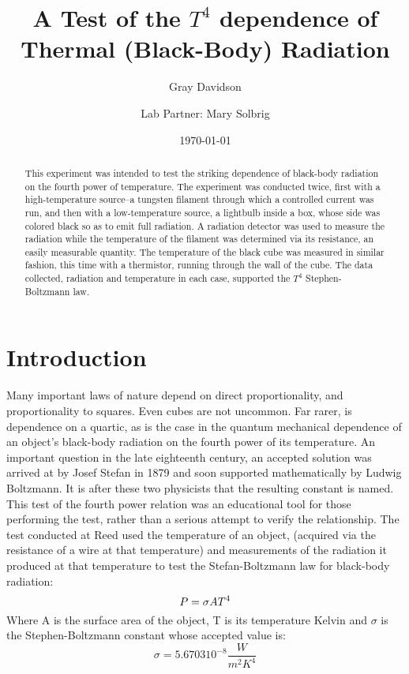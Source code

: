 \documentclass[aps,pre,twocolumn,nofootinbib]{revtex4}
\begin{document}
\title{A Test of the $T^4$ dependence of Thermal (Black-Body) Radiation}

\author{Gray Davidson}
\author{Lab Partner: Mary Solbrig }

\date{\today}

\begin{abstract}  
This experiment was intended to test the striking dependence of black-body radiation on the fourth power of temperature.  The experiment was conducted twice, first with a high-temperature source--a tungsten filament through which a controlled current was run, and then with a low-temperature source, a lightbulb inside a box, whose side was colored black so as to emit full radiation.  A radiation detector was used to measure the radiation while the temperature of the filament was determined via its resistance, an easily measurable quantity.  The temperature of the black cube was measured in similar fashion, this time with a thermistor, running through the wall of the cube.  The data collected, radiation and temperature in each case, supported the $T^4$ Stephen-Boltzmann law.   
\end{abstract}
\maketitle

\section{Introduction}

Many important laws of nature depend on direct proportionality, and proportionality to squares.  Even cubes are not uncommon.  Far rarer, is dependence on a quartic, as is the case in the quantum mechanical dependence of an object's black-body radiation on the fourth power of its temperature.  \cite{Scribner2008} An important question in the late eighteenth century, an accepted solution was arrived at by Josef Stefan in 1879 and soon supported mathematically by Ludwig Boltzmann.  It is after these two physicists that the resulting constant is named.  \cite{constant}  This test of the fourth power relation was an educational tool for those performing the test, rather than a serious attempt to verify the relationship.  The test conducted at Reed used the temperature of an object, (acquired via the resistance of a wire at that temperature) and measurements of the radiation it produced at that temperature to test the Stefan-Boltzmann law for black-body radiation: 
\begin{equation}
\label{Stephan-Boltzmann Law}
P=\sigma AT^4\\
\end{equation}
Where A is the surface area of the object, T is its temperature Kelvin and $\sigma$ is the Stephen-Boltzmann constant whose accepted value is: 
\begin{equation}
\label{Stephan-Boltzmann Constant*}
\sigma=5.6703 10^{-8} \frac{W}{m^2K^4}
\end{equation}
\end{document}
